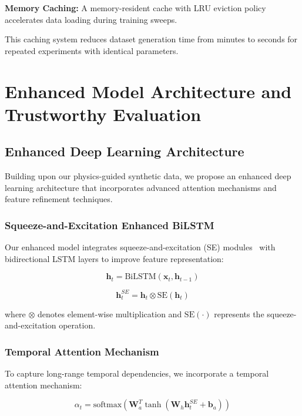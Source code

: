 \documentclass[journal]{IEEEtran}
\begin{document}
\textbf{Memory Caching:} A memory-resident cache with LRU eviction policy accelerates data loading during training sweeps.

This caching system reduces dataset generation time from minutes to seconds for repeated experiments with identical parameters.

\section{Enhanced Model Architecture and Trustworthy Evaluation}

\subsection{Enhanced Deep Learning Architecture}

Building upon our physics-guided synthetic data, we propose an enhanced deep learning architecture that incorporates advanced attention mechanisms and feature refinement techniques.

\subsubsection{Squeeze-and-Excitation Enhanced BiLSTM}

Our enhanced model integrates squeeze-and-excitation (SE) modules~\cite{reference13} with bidirectional LSTM layers to improve feature representation:

\begin{equation}
\mathbf{h}_t = \text{BiLSTM}(\mathbf{x}_t, \mathbf{h}_{t-1})
\end{equation}

\begin{equation}
\mathbf{h}_t^{SE} = \mathbf{h}_t \otimes \text{SE}(\mathbf{h}_t)
\end{equation}

where $\otimes$ denotes element-wise multiplication and $\text{SE}(\cdot)$ represents the squeeze-and-excitation operation.

\subsubsection{Temporal Attention Mechanism}

To capture long-range temporal dependencies, we incorporate a temporal attention mechanism:

\begin{equation}
\alpha_t = \text{softmax}(\mathbf{W}_a^T \tanh(\mathbf{W}_h \mathbf{h}_t^{SE} + \mathbf{b}_a))
\end{equation}
\end{document}
